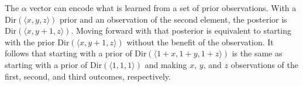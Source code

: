 The $\alpha$ vector can encode what is learned from a set of prior observations. With a $\mbox{Dir}(\langle x, y, z \rangle)$ prior and an observation of the second element, the posterior is $\mbox{Dir}(\langle x, y+1, z \rangle)$. Moving forward with that posterior is equivalent to starting with the prior $\mbox{Dir}(\langle x, y+1, z \rangle)$ without the benefit of the observation. It follows that starting with a prior of $\mbox{Dir}(\langle 1+x, 1+y, 1+z \rangle)$ is the same as starting with a prior of $\mbox{Dir}(\langle 1, 1, 1 \rangle)$ and making $x$, $y$, and $z$ observations of the first, second, and third outcomes, respectively.


